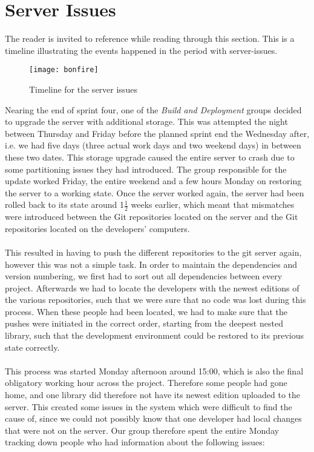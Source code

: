 
\section{Server Issues}
\label{sec:server_issues}

The reader is invited to reference  while reading through this section. This is a timeline illustrating the events happened in the period with server-issues. 

\begin{figure}[!htbp]
	\centering
	\texttt{[image: bonfire]}
	\caption{Timeline for the server issues}
	\label{fig:bonefire}
\end{figure}

Nearing the end of sprint four, one of the \emph{Build and Deployment} groups decided to upgrade the server with additional storage. This was attempted the night between Thursday and Friday before the planned sprint end the Wednesday after, i.e. we had five days (three actual work days and two weekend days) in between these two dates. This storage upgrade caused the entire server to crash due to some partitioning issues they had introduced. The group responsible for the update worked Friday, the entire weekend and a few hours Monday on restoring the server to a working state. Once the server worked again, the server had been rolled back to its state around 1$\frac{1}{2}$ weeks earlier, which meant that mismatches were introduced between the Git repositories located on the server and the Git repositories located on the developers' computers. 
\\\\
This resulted in having to push the different repositories to the git server again, however this was not a simple task. In order to maintain the dependencies and version numbering, we first had to sort out all dependencies between every project. Afterwards we had to locate the developers with the newest editions of the various repositories, such that we were sure that no code was lost during this process. When these people had been located, we had to make sure that the pushes were initiated in the correct order, starting from the deepest nested library, such that the development environment could be restored to its previous state correctly.
\\\\
This process was started Monday afternoon around 15:00, which is also the final obligatory working hour across the project. Therefore some people had gone home, and one library did therefore not have its newest edition uploaded to the server. This created some issues in the system which were difficult to find the cause of, since we could not possibly know that one developer had local changes that were not on the server. Our group therefore spent the entire Monday tracking down people who had information about the following issues:

